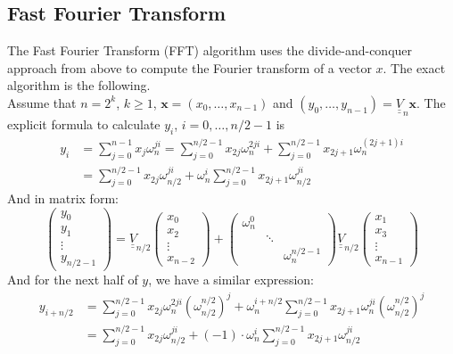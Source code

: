 \documentclass[12pt, openany]{report}
\theoremstyle{definition}
\def\mat#1{\underline{\underline{#1}}}
\begin{document}
\subsection{Fast Fourier Transform}
The Fast Fourier Transform (FFT) algorithm uses the divide-and-conquer approach from above to compute the Fourier transform of a vector $x$. The exact algorithm is the following.\\
Assume that $n=2^k$, $k\ge 1$, $\textbf{x}=(x_0,\dots, x_{n-1})$ and $(y_0,\dots,y_{n-1}) = \mat{V}_n \textbf{x}$. The explicit formula to calculate $y_i$, $i=0,\dots,n/2-1$ is 
\begin{equation}
	\begin{aligned}
		y_i &= \sum_{j=0}^{n-1} x_j \omega_n^{ji} = \sum_{j=0}^{n/2-1}x_{2j}\omega_{n}^{2ji} + \sum_{j=0}^{n/2-1} x_{2j+1}\omega_n^{(2j+1)i} \\
		&= \sum_{j=0}^{n/2-1}x_{2j}\omega_{n/2}^{ji} + \omega^i_n\sum_{j=0}^{n/2-1} x_{2j+1}\omega_{n/2}^{ji}
	\end{aligned}
\end{equation}
And in matrix form:
\begin{equation}
	\begin{pmatrix}
		y_0 \\ y_1 \\ \vdots \\ y_{n/2-1}
		\end{pmatrix} = \mat{V}_{n/2} \begin{pmatrix}
			x_0\\x_2 \\ \vdots \\ x_{n-2}
		\end{pmatrix} + \begin{pmatrix}
			\omega_n^0 && \\ & \ddots & \\ & & \omega_n^{n/2-1}
	\end{pmatrix} \mat{V}_{n/2} \begin{pmatrix}
		x_1\\x_3\\\vdots \\x_{n-1}
	\end{pmatrix}
\end{equation}
And for the next half of $y$, we have a similar expression:
\begin{equation}
	\begin{aligned}
		y_{i+n/2} &= \sum_{j=0}^{n/2-1} x_{2j}\omega_{n}^{2ji}\left(\omega_{n/2}^{n/2}\right)^j + \omega_n^{i+n/2}\sum_{j=0}^{n/2-1} x_{2j+1}\omega_n^{ji}\left(\omega_{n/2}^{n/2}\right)^j \\
		&= \sum_{j=0}^{n/2-1}x_{2j}\omega_{n/2}^{ji} + (-1)\cdot \omega^i_n\sum_{j=0}^{n/2-1} x_{2j+1}\omega_{n/2}^{ji}
	\end{aligned}
\end{equation}
\end{document}
